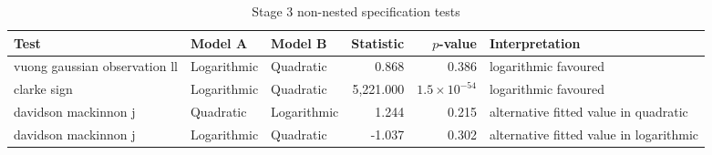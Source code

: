 \begin{table}[H]
\centering
\scriptsize
\caption{Stage 3 non-nested specification tests}
\label{tab:app_stage3_specification_tests}
\begin{adjustbox}{max width=\textwidth,center}
\begin{tabular}{@{}lllrrL{4.2cm}@{}}
\toprule
Test & Model A & Model B & Statistic & $p$-value & Interpretation \\
\midrule
vuong gaussian observation ll & Logarithmic & Quadratic &     0.868 & 0.386 & logarithmic favoured \\
clarke sign & Logarithmic & Quadratic & 5,221.000 & $1.5 \times 10^{-54}$ & logarithmic favoured \\
davidson mackinnon j & Quadratic & Logarithmic &     1.244 & 0.215 & alternative fitted value in quadratic \\
davidson mackinnon j & Logarithmic & Quadratic &    -1.037 & 0.302 & alternative fitted value in logarithmic \\
\bottomrule
\end{tabular}
\end{adjustbox}
\end{table}
